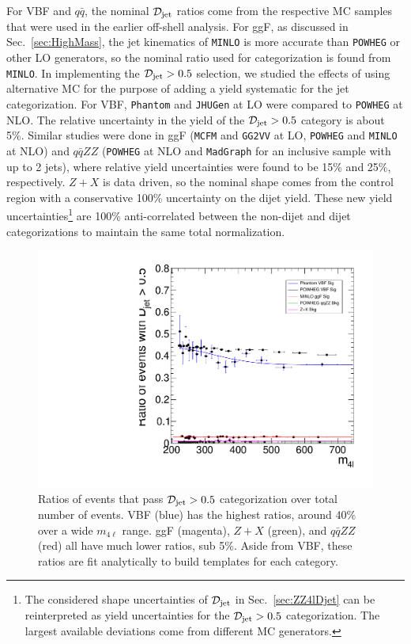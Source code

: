 For VBF and $q\bar{q}$, the nominal $\mathcal{D}_{\rm jet}$ ratios come from the respective MC samples that were used in the earlier off-shell analysis. For ggF, as discussed in Sec.~\ref{sec:HighMass}, the jet kinematics of {\tt MINLO} is more accurate than {\tt POWHEG} or other LO generators, so the nominal ratio used for categorization is found from {\tt MINLO}. In implementing the $\mathcal{D}_{\rm jet}>0.5$ selection, we studied the effects of using alternative MC for the purpose of adding a yield systematic for the jet categorization. For VBF, {\tt Phantom} and {\tt JHUGen} at LO were compared to {\tt POWHEG} at NLO. The relative uncertainty in the yield of the $\mathcal{D}_{\rm jet}>0.5$ category is about 5\%. Similar studies were done in ggF ({\tt MCFM} and {\tt GG2VV} at LO, {\tt POWHEG} and {\tt MINLO} at NLO) and $q\bar{q}ZZ$ ({\tt POWHEG} at NLO and {\tt MadGraph} for an inclusive sample with up to 2 jets), where relative yield uncertainties were found to be 15\% and 25\%, respectively. $Z+X$ is data driven, so the nominal shape comes from the control region with a conservative 100\% uncertainty on the dijet yield. These new yield uncertainties\footnote{The considered shape uncertainties of $\mathcal{D}_{\rm jet}$ in Sec.~\ref{sec:ZZ4lDjet} can be reinterpreted as yield uncertainties for the $\mathcal{D}_{\rm jet}>0.5$ categorization. The largest available deviations come from different MC generators.} are 100\% anti-correlated between the non-dijet and dijet categorizations to maintain the same total normalization.

\begin{figure}[htbp]
\begin{center}
\includegraphics[width=.7\linewidth]{HiggsProperties/figures/DjetCutShapeOverlay_8TeV_Sig+Bkg_all.pdf}
\caption[$\mathcal{D}_{\rm jet}>0.5$ Ratios for Production Separation in $f_{\Lambda Q}$ Measurement]{Ratios of events that pass $\mathcal{D}_{\rm jet}>0.5$ categorization over total number of events. VBF (blue) has the highest ratios, around 40\% over a wide $m_{4\ell}$ range. ggF (magenta), $Z+X$ (green), and $q\bar{q}ZZ$ (red) all have much lower ratios, sub 5\%. Aside from VBF, these ratios are fit analytically to build templates for each category.}
\label{fig:DjetRatios}
\end{center}
\end{figure}

